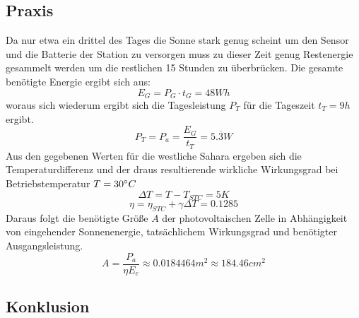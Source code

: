 \subsection{Praxis}
    Da nur etwa ein drittel des Tages die Sonne stark genug scheint
    um den Sensor und die Batterie der Station zu versorgen muss zu
    dieser Zeit genug Restenergie gesammelt werden um die restlichen
    15 Stunden zu überbrücken. Die gesamte benötigte Energie ergibt
    sich aus:
        \[ E_G = P_G \cdot t_G = 48 Wh \]
    woraus sich wiederum ergibt sich die Tagesleistung \( P_T \)
    für die Tageszeit \( t_T = 9h \) ergibt.
        \[ P_T = P_a = \frac{E_G}{t_T} = 5.\overline{3} W \]
    Aus den gegebenen Werten für die westliche Sahara ergeben sich
    die Temperaturdifferenz und der draus resultierende wirkliche
    Wirkungsgrad bei Betriebstemperatur \( T = 30 \degree C\)
        \[ \Delta T = T - T_{STC} = 5 K \]
        \[ \eta = \eta_{STC} + \gamma \Delta T = 0.1285 \]
    Daraus folgt die benötigte Größe \( A \) der photovoltaischen
    Zelle in Abhängigkeit von eingehender Sonnenenergie, tatsächlichem
    Wirkungsgrad und benötigter Ausgangsleistung.
        \[ A = \frac{P_a}{\eta E_e} \approx 0.0184464 m^2 \approx
        184.46 cm^2 \]

\subsection{Konklusion}
